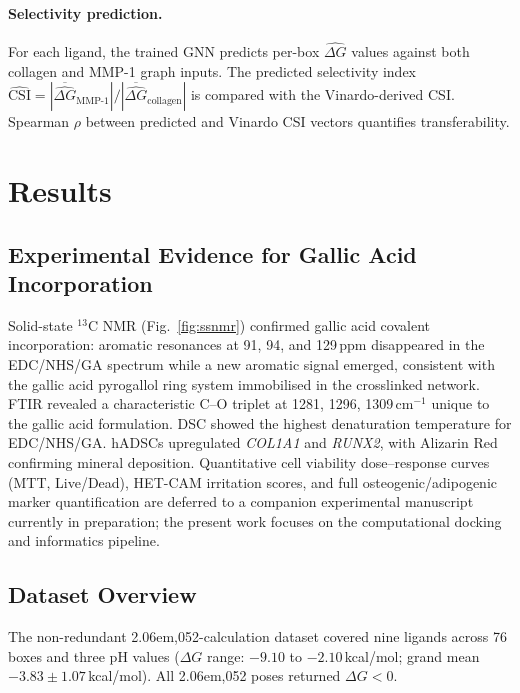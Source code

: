 \documentclass[11pt]{article}
\begin{document}
\paragraph{Selectivity prediction.}
For each ligand, the trained GNN predicts per-box $\hat{\Delta G}$ values
against both collagen and MMP-1 graph inputs.  The predicted selectivity
index $\widehat{\mathrm{CSI}} =
|\overline{\hat{\Delta G}}_{\mathrm{MMP\text{-}1}}| /
|\overline{\hat{\Delta G}}_{\mathrm{collagen}}|$ is compared with the
Vinardo-derived CSI.  Spearman $\rho$ between predicted and Vinardo CSI vectors
quantifies transferability.


\section{Results}
\label{sec:results}

\subsection{Experimental Evidence for Gallic Acid Incorporation}
\label{sec:exp_results}

Solid-state $^{13}$C NMR (Fig.~\ref{fig:ssnmr}) confirmed gallic acid
covalent incorporation: aromatic resonances at 91, 94, and 129\,ppm
disappeared in the EDC/NHS/GA spectrum while a new aromatic signal emerged,
consistent with the gallic acid pyrogallol ring system immobilised in the
crosslinked network.
FTIR revealed a characteristic C--O triplet at 1281, 1296, 1309\,cm$^{-1}$
unique to the gallic acid formulation.
DSC showed the highest denaturation temperature for EDC/NHS/GA.
hADSCs upregulated \emph{COL1A1} and \emph{RUNX2}, with Alizarin Red
confirming mineral deposition.
Quantitative cell viability dose--response curves (MTT, Live/Dead),
HET-CAM irritation scores, and full osteogenic/adipogenic marker
quantification are deferred to a companion experimental manuscript
currently in preparation; the present work focuses on the computational
docking and informatics pipeline.

\subsection{Dataset Overview}
\label{sec:overview}

The non-redundant 2\kern .06em,052-calculation dataset covered nine ligands
across 76 boxes and three pH values
($\Delta G$ range: $-9.10$ to $-2.10$\,kcal/mol; grand mean
$-3.83 \pm 1.07$\,kcal/mol).
All 2\kern .06em,052 poses returned $\Delta G < 0$.
\end{document}
